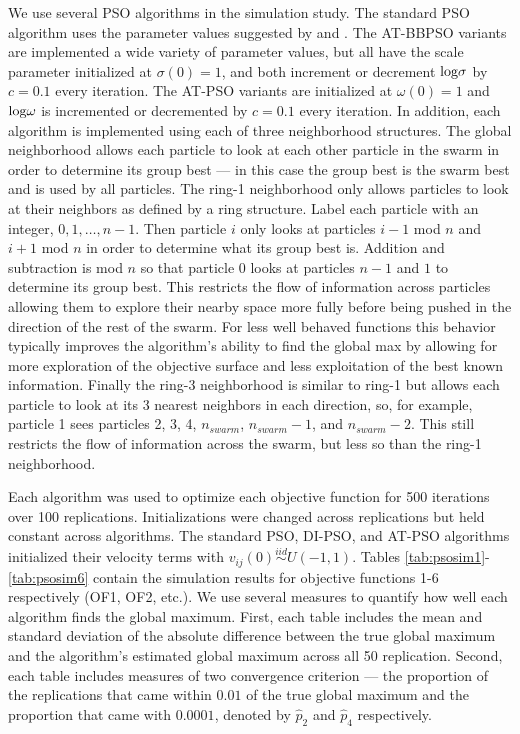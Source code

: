 \documentclass[12pt]{article}
\def\log{\hbox{log}}
\begin{document}
\begin{appendix}
We use several PSO algorithms in the simulation study. The standard PSO algorithm uses the parameter values suggested by \cite{blum2008swarm} and \cite{clerc2002particle}. The AT-BBPSO variants are implemented a wide variety of parameter values, but all have the scale parameter initialized at $\sigma(0)=1$, and both increment or decrement $\log\sigma$ by $c=0.1$ every iteration. The AT-PSO variants are initialized at $\omega(0)=1$ and $\log\omega$ is incremented or decremented by $c=0.1$ every iteration. In addition, each algorithm is implemented using each of three neighborhood structures. The global neighborhood allows each particle to look at each other particle in the swarm in order to determine its group best --- in this case the group best is the swarm best and is used by all particles. The ring-1 neighborhood only allows particles to look at their neighbors as defined by a ring structure. Label each particle with an integer, $0, 1, \dots, n-1$. Then particle $i$ only looks at particles $i-1$ mod $n$ and $i+1$ mod $n$ in order to determine what its group best is. Addition and subtraction is mod $n$ so that particle $0$ looks at particles $n-1$ and $1$ to determine its group best. This restricts the flow of information across particles allowing them to explore their nearby space more fully before being pushed in the direction of the rest of the swarm. For less well behaved functions this behavior typically improves the algorithm's ability to find the global max by allowing for more exploration of the objective surface and less exploitation of the best known information. Finally the ring-3 neighborhood is similar to ring-1 but allows each particle to look at its 3 nearest neighbors in each direction, so, for example, particle 1 sees particles 2, 3, 4, $n_{swarm}$, $n_{swarm} -1$, and $n_{swarm}-2$. This still restricts the flow of information across the swarm, but less so than the ring-1 neighborhood. 

Each algorithm was used to optimize each objective function for 500 iterations over 100 replications. Initializations were changed across replications but held constant across algorithms. The standard PSO, DI-PSO, and AT-PSO algorithms initialized their velocity terms with $v_{ij}(0)\stackrel{iid}{\sim}U(-1,1)$. Tables \ref{tab:psosim1}-\ref{tab:psosim6} contain the simulation results for objective functions 1-6 respectively (OF1, OF2, etc.). We use several measures to quantify how well each algorithm finds the global maximum. First, each table includes the mean and standard deviation of the absolute difference between the true global maximum and the algorithm's estimated global maximum across all 50 replication. Second, each table includes measures of two convergence criterion --- the proportion of the replications that came within $0.01$ of the true global maximum and the proportion that came with $0.0001$, denoted by $\widehat{p}_2$ and $\widehat{p}_4$ respectively. 


\end{appendix}
\end{document}
